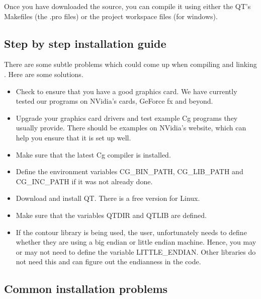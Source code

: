 Once you have downloaded the source, you can compile it using either
the QT's Makefiles (the .pro files) or the project workspace files
(for windows).

\subsection{Step by step installation guide}

There are some subtle problems which could come up when compiling
and linking \TexMol. Here are some solutions.

\begin{itemize}

\item Check to ensure that you have a good graphics card. We have
currently tested our programs on NVidia's cards, GeForce fx and
beyond.

\item Upgrade your graphics card drivers and test example Cg
programs they usually provide. There should be examples on NVidia's
website, which can help you ensure that it is set up well.

\item Make sure that the latest Cg compiler is installed.

\item Define the environment variables CG\_BIN\_PATH, CG\_LIB\_PATH and
CG\_INC\_PATH if it was not already done.

\item Download and install QT. There is a free version for Linux.

\item Make sure that the variables QTDIR and QTLIB are defined.

\item If the contour library is being used, the user, unfortunately
needs to define whether they are using a big endian or little endian
machine. Hence, you may or may not need to define the variable
LITTLE\_ENDIAN. Other libraries do not need this and can figure out
the endianness in the code.

\end{itemize}

\subsection{Common installation problems}

